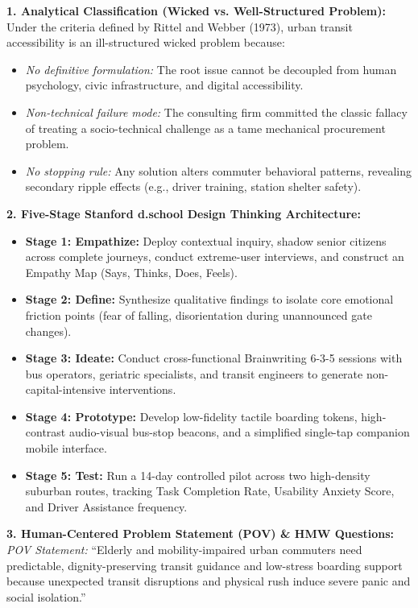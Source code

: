 \begin{solbox}
\textbf{1. Analytical Classification (Wicked vs. Well-Structured Problem):}\\
Under the criteria defined by Rittel and Webber (1973), urban transit accessibility is an ill-structured wicked problem because:
\begin{itemize}
    \item \textit{No definitive formulation:} The root issue cannot be decoupled from human psychology, civic infrastructure, and digital accessibility.
    \item \textit{Non-technical failure mode:} The consulting firm committed the classic fallacy of treating a socio-technical challenge as a tame mechanical procurement problem.
    \item \textit{No stopping rule:} Any solution alters commuter behavioral patterns, revealing secondary ripple effects (e.g., driver training, station shelter safety).
\end{itemize}

\textbf{2. Five-Stage Stanford d.school Design Thinking Architecture:}\\
\begin{itemize}
    \item \textbf{Stage 1: Empathize:} Deploy contextual inquiry, shadow senior citizens across complete journeys, conduct extreme-user interviews, and construct an Empathy Map (Says, Thinks, Does, Feels).
    \item \textbf{Stage 2: Define:} Synthesize qualitative findings to isolate core emotional friction points (fear of falling, disorientation during unannounced gate changes).
    \item \textbf{Stage 3: Ideate:} Conduct cross-functional Brainwriting 6-3-5 sessions with bus operators, geriatric specialists, and transit engineers to generate non-capital-intensive interventions.
    \item \textbf{Stage 4: Prototype:} Develop low-fidelity tactile boarding tokens, high-contrast audio-visual bus-stop beacons, and a simplified single-tap companion mobile interface.
    \item \textbf{Stage 5: Test:} Run a 14-day controlled pilot across two high-density suburban routes, tracking Task Completion Rate, Usability Anxiety Score, and Driver Assistance frequency.
\end{itemize}

\textbf{3. Human-Centered Problem Statement (POV) \& HMW Questions:}\\
\textit{POV Statement:} ``Elderly and mobility-impaired urban commuters need predictable, dignity-preserving transit guidance and low-stress boarding support because unexpected transit disruptions and physical rush induce severe panic and social isolation.''


\end{solbox}
